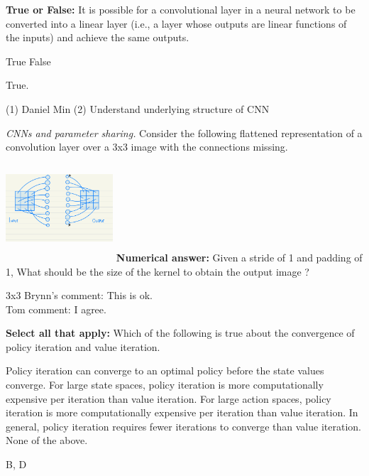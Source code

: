\begin{questions}
\question[1] \textbf{True or False:} It is possible for a convolutional layer in a neural network to be converted into a linear layer (i.e., a layer whose outputs are linear functions of the inputs) and achieve the same outputs.
    \begin{checkboxes}
     \choice True 
     \choice False
    \end{checkboxes}
    \begin{soln}
    True. 
    \end{soln}
    \begin{qauthor}
    (1) Daniel Min (2) Understand underlying structure of CNN
    \end{qauthor}
    
\question[2] \textit{CNNs and parameter sharing.} Consider the following flattened representation of a convolution layer over a 3x3 image with the connections missing.
    \\ \includegraphics[width=4cm,height=4cm]{figures/CNN_flat.jpeg}
     \textbf{Numerical answer:} Given a stride of 1 and padding of 1, What should be the size of the kernel to obtain the output image ?
    \begin{tcolorbox}[fit,height=1cm, width=2cm, blank, borderline={1pt}{-2pt}]
    \end{tcolorbox}
    \begin{soln}
    3x3
    Brynn's comment: This is ok. \\ Tom comment: I agree.
    \end{soln}

\question[1] \textbf{Select all that apply:} Which of the following is true about the convergence of policy iteration and value iteration. 
    {%
    \checkboxchar{$\Box$} %
    \begin{checkboxes}
     \choice Policy iteration can converge to an optimal policy before the state values converge.  
     \choice For large state spaces, policy iteration is more computationally expensive per iteration than value iteration.
     \choice For large action spaces, policy iteration is more computationally expensive per iteration than value iteration. 
     \choice In general, policy iteration requires fewer iterations to converge than value iteration.
     \choice None of the above.
    \end{checkboxes}
    }
    \begin{soln}
    B, D
    

\end{soln}
\end{questions}
